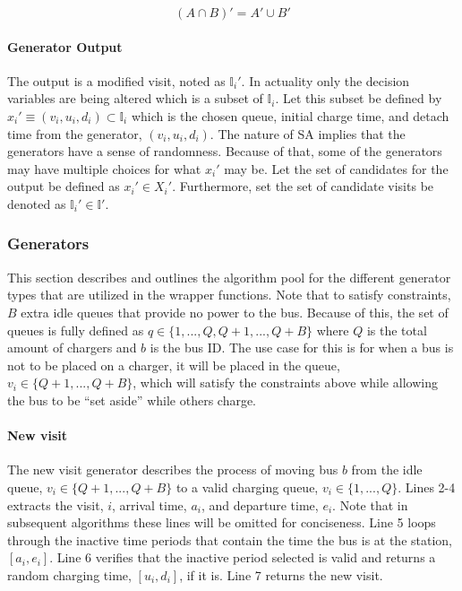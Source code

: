 \documentclass[11pt,a4paper,final]{article}
\newcommand{\I}{\mathbb{I}}                 %
\begin{document}
\begin{equation}
\label{eq:demorgan}
(A \cap B)' = A' \cup B'
\end{equation}

\paragraph{Generator Output}
\label{sec:orgde3c909}
The output is a modified visit, noted as \(\I_i'\). In actuality only the decision variables are being altered which is a
subset of \(\I_i\). Let this subset be defined by \(x_i' \equiv (v_i, u_i, d_i) \subset \I_i\) which is the chosen queue, initial
charge time, and detach time from the generator, \((v_i, u_i, d_i)\). The nature of SA implies that the generators have a
sense of randomness. Because of that, some of the generators may have multiple choices for what \(x_i'\) may be. Let the
set of candidates for the output be defined as \(x_i' \in X_i'\). Furthermore, set the set of candidate visits be denoted as
\(\I_i' \in \I'\).

\subsubsection{Generators}
\label{sec:generators}
This section describes and outlines the algorithm pool for the different generator types that are utilized in the
wrapper functions. Note that to satisfy constraints, \(B\) extra idle queues that provide no power to the bus. Because of
this, the set of queues is fully defined as \(q \in \{1,..., Q, Q+1,..., Q+B\}\) where \(Q\) is the total amount of chargers
and \(b\) is the bus ID. The use case for this is for when a bus is not to be placed on a charger, it will be placed in
the queue, \(v_i \in \{Q+1,..., Q+B\}\), which will satisfy the constraints above while allowing the bus to be ``set aside''
while others charge.

\paragraph{New visit}
\label{new-visit}
The new visit generator describes the process of moving bus \(b\) from the idle queue, \(v_i \in \{Q+1,..., Q+B\}\) to a valid
charging queue, \(v_i \in \{1,..., Q\}\). Lines 2-4 extracts the visit, \(i\), arrival time, \(a_i\), and departure time, \(e_i\).
Note that in subsequent algorithms these lines will be omitted for conciseness. Line 5 loops through the inactive time
periods that contain the time the bus is at the station, \([a_i, e_i]\). Line 6 verifies that the inactive period selected
is valid and returns a random charging time, \([u_i, d_i]\), if it is. Line 7 returns the new visit.
\end{document}
